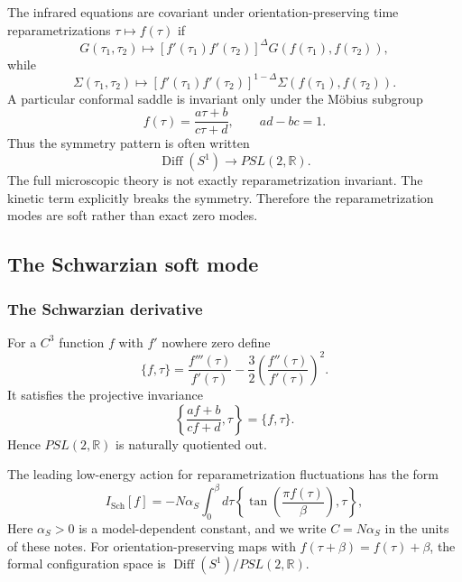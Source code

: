 \documentclass[11pt]{article}
\numberwithin{equation}{section}
\theoremstyle{exposition}
\theoremstyle{result}
\newcommand{\R}{\mathbb R}
\newcommand{\Diff}{\operatorname{Diff}}
\newcommand{\Sch}{\mathrm{Sch}}
\begin{document}
The infrared equations are covariant under orientation-preserving time reparametrizations $\tau\mapsto f(\tau)$ if
\begin{equation}
G(\tau_1,\tau_2)
\mapsto
[f'(\tau_1)f'(\tau_2)]^\Delta
G(f(\tau_1),f(\tau_2)),
\label{eq:reparamG}
\end{equation}
while
\begin{equation*}
\Sigma(\tau_1,\tau_2)
\mapsto
[f'(\tau_1)f'(\tau_2)]^{1-\Delta}
\Sigma(f(\tau_1),f(\tau_2)).
\end{equation*}
A particular conformal saddle is invariant only under the M\"obius subgroup
\begin{equation*}
f(\tau)=\frac{a\tau+b}{c\tau+d},
\qquad ad-bc=1.
\end{equation*}
Thus the symmetry pattern is often written
\begin{equation*}
\Diff(S^1)\longrightarrow PSL(2,\R).
\end{equation*}
The full microscopic theory is not exactly reparametrization invariant. The kinetic term explicitly breaks the symmetry. Therefore the reparametrization modes are soft rather than exact zero modes.

\subsection{The Schwarzian soft mode}\label{sec:soft}

\subsubsection{The Schwarzian derivative}

For a $C^3$ function $f$ with $f'$ nowhere zero define
\begin{equation}
\{f,\tau\}
=\frac{f'''(\tau)}{f'(\tau)}
-\frac32\left(\frac{f''(\tau)}{f'(\tau)}\right)^2.
\label{eq:schwarzian}
\end{equation}
It satisfies the projective invariance
\begin{equation*}
\left\{\frac{af+b}{cf+d},\tau\right\}=\{f,\tau\}.
\end{equation*}
Hence $PSL(2,\R)$ is naturally quotiented out.

The leading low-energy action for reparametrization fluctuations has the form
\begin{equation}
I_{\Sch}[f]
=-N\alpha_S
\int_0^\beta d\tau
\left\{
\tan\left(\frac{\pi f(\tau)}{\beta}\right),\tau
\right\},
\label{eq:SchAction}
\end{equation}
Here $\alpha_S>0$ is a model-dependent constant, and we write $C=N\alpha_S$ in the units of these notes. For orientation-preserving maps with $f(\tau+\beta)=f(\tau)+\beta$, the formal configuration space is $\Diff(S^1)/PSL(2,\R)$.
\end{document}
